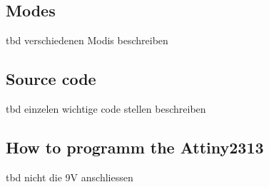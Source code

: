 \subsection{Modes}
tbd
verschiedenen Modis beschreiben

\subsection{Source code}
tbd
einzelen wichtige code stellen beschreiben

\subsection{How to programm the Attiny2313}
tbd
nicht die 9V anschliessen


